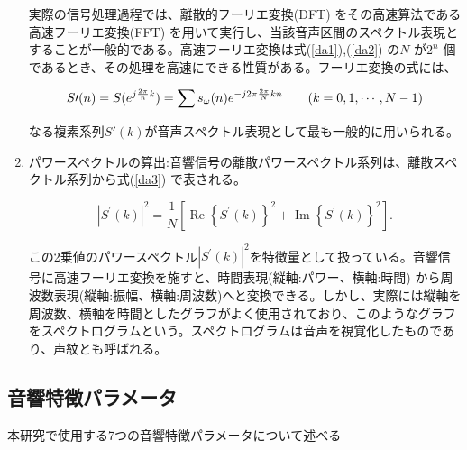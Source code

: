 \begin{enumerate}
実際の信号処理過程では、離散的フーリエ変換(DFT) をその高速算法である高速フーリエ変換(FFT) を用いて実行し、当該音声区間のスペクトル表現とすることが一般的である。高速フーリエ変換は式(\ref{da1}),(\ref{da2}) の$N$ が$2^n$ 個であるとき、その処理を高速にできる性質がある。フーリエ変換の式には、

\begin{equation}
S\prime(n)=S(e^{j\frac{2\pi}{n}k})=\sum s_\omega(n)e^{-j2\pi \frac{2\pi}{N}kn} \qquad (k=0,1,\cdots,N-1) \notag
\end{equation}

なる複素系列$S\prime(k)$が音声スペクトル表現として最も一般的に用いられる。

\item パワースペクトルの算出:音響信号の離散パワースペクトル系列は、離散スペクトル系列から式(\ref{da3}) で表される。

\begin{equation}
\label{da3}
|S^\prime(k)|^2=\frac{1}{N}[\operatorname{Re}\left\{S^\prime(k)\right\}^2+\operatorname{Im}\left\{S^\prime(k)\right\}^2].
\end{equation}

この2乗値のパワースペクトル$|S^\prime(k)|^2$を特徴量として扱っている。音響信号に高速フーリエ変換を施すと、時間表現(縦軸:パワー、横軸:時間) から周波数表現(縦軸:振幅、横軸:周波数)へと変換できる。しかし、実際には縦軸を周波数、横軸を時間としたグラフがよく使用されており、このようなグラフをスペクトログラムという。スペクトログラムは音声を視覚化したものであり、声紋とも呼ばれる。

\end{enumerate}\par

\subsection{音響特徴パラメータ}
本研究で使用する7つの音響特徴パラメータについて述べる\cite{shimae_10}

